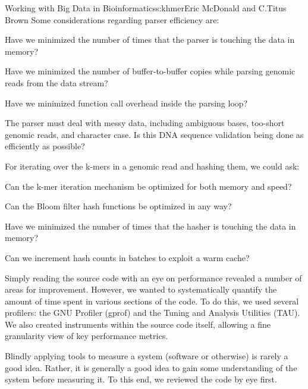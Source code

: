 \begin{aosachapter}{Working with Big Data in Bioinformatics}{s:khmer}{Eric McDonald and C.\/Titus Brown}
Some considerations regarding parser efficiency are:

\begin{aosaitemize}
\item
  Have we minimized the number of times that the parser is touching the
  data in memory?
\item
  Have we minimized the number of buffer-to-buffer copies while parsing
  genomic reads from the data stream?
\item
  Have we minimized function call overhead inside the parsing loop?
\item
  The parser must deal with messy data, including ambiguous bases,
  too-short genomic reads, and character case. Is this DNA sequence
  validation being done as efficiently as possible?
\end{aosaitemize}

For iterating over the k-mers in a genomic read and hashing them, we
could ask:

\begin{aosaitemize}
\item
  Can the k-mer iteration mechanism be optimized for both memory and
  speed?
\item
  Can the Bloom filter hash functions be optimized in any way?
\item
  Have we minimized the number of times that the hasher is touching the
  data in memory?
\item
  Can we increment hash counts in batches to exploit a warm cache?
\end{aosaitemize}


Simply reading the source code with an eye on performance revealed a
number of areas for improvement. However, we wanted to systematically
quantify the amount of time spent in various sections of the code. To do
this, we used several profilers: the GNU Profiler (gprof) and the Tuning
and Analysis Utilities (TAU). We also created instruments within the
source code itself, allowing a fine granularity view of key performance
metrics.


Blindly applying tools to measure a system (software or otherwise) is
rarely a good idea. Rather, it is generally a good idea to gain some
understanding of the system before measuring it. To this end, we
reviewed the code by eye first.


\end{aosachapter}

